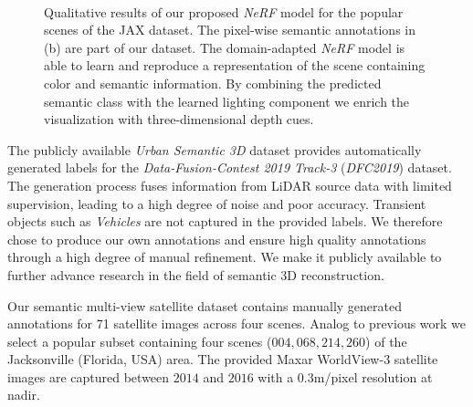 \begin{figure*}[ht]
	\vspace{0.2 cm}
	\begin{minipage}{0.015\linewidth}
		\centering
	\end{minipage}
	\begin{minipage}{0.98\linewidth}
		\centering
		\hfill
		\hfill
		\hfill
		\hfill
	\end{minipage}\\
	
	
	\caption{
		Qualitative results of our proposed \emph{NeRF} model for the popular scenes of the JAX dataset. The pixel-wise semantic annotations in (b) are part of our dataset.
		The domain-adapted \emph{NeRF} model is able to learn and reproduce 
		a representation of the scene containing color and semantic information. By combining the predicted semantic class with the learned lighting component we enrich the visualization with three-dimensional depth cues. }
	\label{fig:results}
\end{figure*}

The publicly available \textit{Urban Semantic 3D} \cite{us3d} dataset provides automatically generated labels for the \emph{Data-Fusion-Contest 2019 Track-3} (\emph{DFC2019}) \cite{dfc2019} dataset. 
The generation process fuses information from LiDAR source data with limited supervision, leading to a high degree of noise and poor accuracy.
Transient objects such as \emph{Vehicles} are not captured in the provided labels.
We therefore chose to produce our own annotations and ensure high quality annotations through a high degree of manual refinement. 
We make it publicly available to further advance research in the field of semantic 3D reconstruction.

Our semantic multi-view satellite dataset contains manually generated annotations for 71 satellite images across four scenes. 
Analog to previous work \cite{snerf,satnerf,eonerf} we select a popular subset containing four scenes ($004, 068,214,260$) of the Jacksonville (Florida, USA) area. The provided Maxar WorldView-3 satellite images are captured between $2014$ and $2016$ with a $0.3$m/pixel resolution at nadir. 


